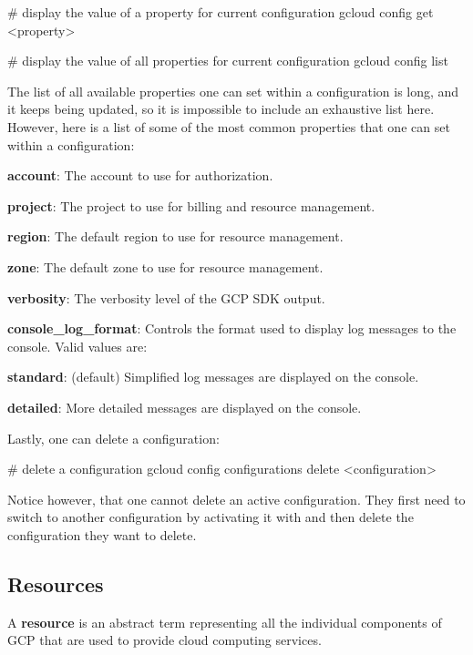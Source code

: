 \begin{bash}
# display the value of a property for current configuration
gcloud config get <property>
\end{bash}

\begin{bash}
# display the value of all properties for current configuration
gcloud config list
\end{bash}

The list of all available properties one can set within a configuration is long, and it keeps being updated, so it is
impossible to include an exhaustive list here. However, here is a list of some of the most common properties that one
can set within a configuration:
\bit
\item \textbf{account}: The account to use for authorization.
\item \textbf{project}: The project to use for billing and resource management.
\item \textbf{region}: The default region to use for resource management.
\item \textbf{zone}: The default zone to use for resource management.
\item \textbf{verbosity}: The verbosity level of the GCP SDK output.
\item \textbf{console\_log\_format}: Controls the format used to display log messages to the console. Valid values are:
    \bit
    \item \textbf{standard}: (default) Simplified log messages are displayed on the console.
    \item \textbf{detailed}: More detailed messages are displayed on the console.
    \eit
\eit

Lastly, one can delete a configuration:
\begin{bash}
# delete a configuration
gcloud config configurations delete <configuration>
\end{bash}

Notice however, that one cannot delete an active configuration. They first need to switch to another configuration by
activating it with  and then delete the configuration they want to delete.

\subsection{Resources}

\bd[Resource]
A \textbf{resource} is an abstract term representing all the individual components of GCP that are used to provide
cloud computing services.
\ed

